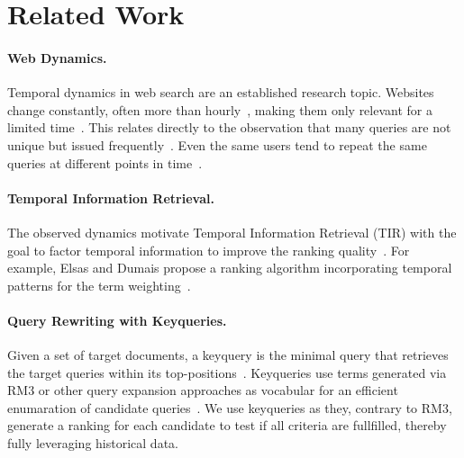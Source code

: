 \section{Related Work}
\label{sec:related-work}

\paragraph{Web Dynamics.} Temporal dynamics in web search are an established research topic. Websites change constantly, often more than hourly~\cite{DBLP:conf/wsdm/AdarTDE09},
making them only relevant for a limited time~\cite{DBLP:conf/sigir/TikhonovBBOKG13}. This relates directly to the observation that many queries are not unique but issued frequently~\cite{DBLP:conf/sigir/Dumais14,DBLP:journals/sigir/SilversteinHMM99}. Even the same users tend to repeat the same queries at different points in time~\cite{DBLP:conf/wsdm/TylerT10}.


\paragraph{Temporal Information Retrieval.} The observed dynamics motivate Temporal Information Retrieval (TIR) with the goal to factor temporal information to improve the ranking quality~\cite{DBLP:journals/ftir/KanhabuaBN15,DBLP:journals/csur/CamposDJJ14}. For example, Elsas and Dumais propose a ranking algorithm incorporating temporal patterns for the term weighting~\cite{DBLP:conf/wsdm/ElsasD10}.


\paragraph{Query Rewriting with Keyqueries.} Given a set of target documents, a keyquery is the minimal query that retrieves the target queries within its top-positions~\cite{gollub:2013a,hagen:2016b}. Keyqueries use terms generated via RM3 or other query expansion approaches as vocabular for an efficient enumaration of candidate queries~\cite{froebe:2022c,froebe:2021c}. We use keyqueries as they, contrary to RM3, generate a ranking for each candidate to test if all criteria are fullfilled, thereby fully leveraging historical data.

